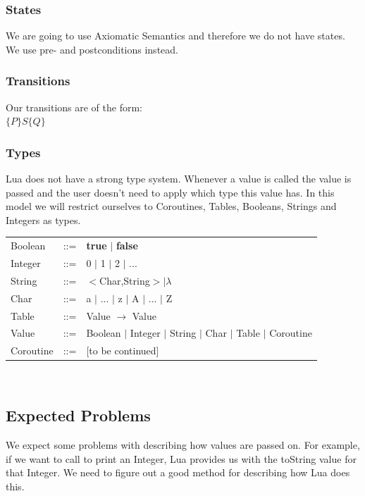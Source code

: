 \documentclass{article}
\begin{document}
\subsubsection{States}
We are going to use Axiomatic Semantics and therefore we do not have states. We use pre- and postconditions instead.
\subsubsection{Transitions}
Our transitions are of the form:\\
$\{P\}S\{Q\}$\\
\subsubsection{Types}
Lua does not have a strong type system. Whenever a value is called the value is passed and the user doesn't need to apply which type this value has. In this model we will restrict ourselves to Coroutines, Tables, Booleans, Strings and Integers as types.\\
\begin{tabular}{lcl}
Boolean &::=& \textbf{true} $|$ \textbf{false}\\
Integer &::=& 0 $|$ 1 $|$ 2 $|$ ...\\
String &::=& $<$Char,String$>| \lambda$ \\
Char &::=& a $|$ ... $|$ z $|$ A $|$ ... $|$ Z \\
Table &::=& Value $\to$ Value\\ %
Value &::=& Boolean $|$ Integer $ |$ String $|$ Char $|$ Table $|$ Coroutine \\
Coroutine &::=& [to be continued] \\ %
\end{tabular}\\

\subsection{Expected Problems}
We expect some problems with describing how values are passed on. For example, if we want to call to print an Integer, Lua provides us with the toString value for that Integer. We need to figure out a good method for describing how Lua does this. 
\end{document}

